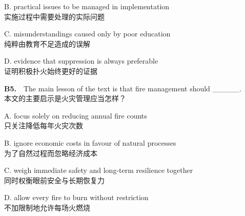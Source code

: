 \documentclass[a4paper,11pt,openany]{report}
\newcommand{\zhline}[1]{{\CJKsf\color{bodygrey}#1}}
\begin{document}
\begin{samepage}
B. practical issues to be managed in implementation\\
\zhline{实施过程中需要处理的实际问题}
\par\end{samepage}

\begin{samepage}
C. misunderstandings caused only by poor education\\
\zhline{纯粹由教育不足造成的误解}
\par\end{samepage}

\begin{samepage}
D. evidence that suppression is always preferable\\
\zhline{证明积极扑火始终更好的证据}
\par\end{samepage}

\begin{samepage}
\textbf{B5.}　The main lesson of the text is that fire management should \_\_\_\_\_.\\
\zhline{本文的主要启示是火灾管理应当怎样？}
\par\end{samepage}

\begin{samepage}
A. focus solely on reducing annual fire counts\\
\zhline{只关注降低每年火灾次数}
\par\end{samepage}

\begin{samepage}
B. ignore economic costs in favour of natural processes\\
\zhline{为了自然过程而忽略经济成本}
\par\end{samepage}

\begin{samepage}
C. weigh immediate safety and long-term resilience together\\
\zhline{同时权衡眼前安全与长期恢复力}
\par\end{samepage}

\begin{samepage}
D. allow every fire to burn without restriction\\
\zhline{不加限制地允许每场火燃烧}
\par\end{samepage}
\end{document}
